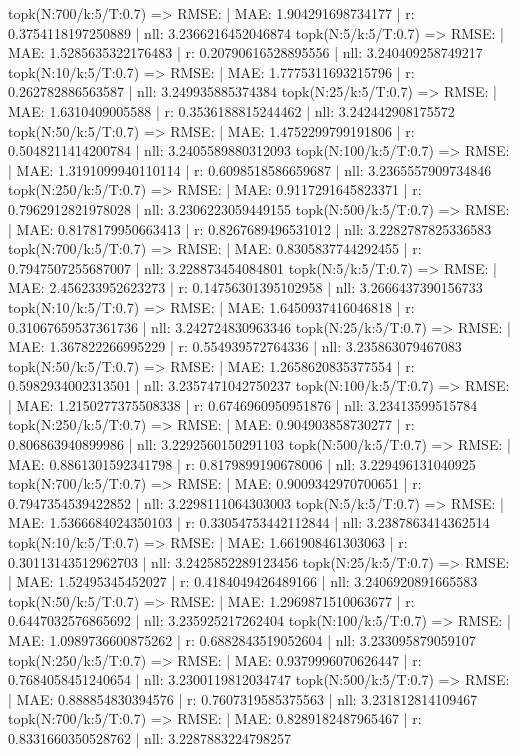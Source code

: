 topk(N:700/k:5/T:0.7) => RMSE: | MAE: 1.904291698734177 | r: 0.3754118197250889 | nll: 3.2366216452046874
topk(N:5/k:5/T:0.7) => RMSE: | MAE: 1.5285635322176483 | r: 0.20790616528895556 | nll: 3.240409258749217
topk(N:10/k:5/T:0.7) => RMSE: | MAE: 1.7775311693215796 | r: 0.262782886563587 | nll: 3.249935885374384
topk(N:25/k:5/T:0.7) => RMSE: | MAE: 1.6310409005588 | r: 0.3536188815244462 | nll: 3.242442908175572
topk(N:50/k:5/T:0.7) => RMSE: | MAE: 1.4752299799191806 | r: 0.5048211414200784 | nll: 3.2405589880312093
topk(N:100/k:5/T:0.7) => RMSE: | MAE: 1.3191099940110114 | r: 0.6098518586659687 | nll: 3.2365557909734846
topk(N:250/k:5/T:0.7) => RMSE: | MAE: 0.9117291645823371 | r: 0.7962912821978028 | nll: 3.2306223059449155
topk(N:500/k:5/T:0.7) => RMSE: | MAE: 0.8178179950663413 | r: 0.8267689496531012 | nll: 3.2282787825336583
topk(N:700/k:5/T:0.7) => RMSE: | MAE: 0.8305837744292455 | r: 0.7947507255687007 | nll: 3.228873454084801
topk(N:5/k:5/T:0.7) => RMSE: | MAE: 2.456233952623273 | r: 0.14756301395102958 | nll: 3.2666437390156733
topk(N:10/k:5/T:0.7) => RMSE: | MAE: 1.6450937416046818 | r: 0.31067659537361736 | nll: 3.242724830963346
topk(N:25/k:5/T:0.7) => RMSE: | MAE: 1.367822266995229 | r: 0.554939572764336 | nll: 3.235863079467083
topk(N:50/k:5/T:0.7) => RMSE: | MAE: 1.2658620835377554 | r: 0.5982934002313501 | nll: 3.2357471042750237
topk(N:100/k:5/T:0.7) => RMSE: | MAE: 1.2150277375508338 | r: 0.6746960950951876 | nll: 3.23413599515784
topk(N:250/k:5/T:0.7) => RMSE: | MAE: 0.904903858730277 | r: 0.806863940899986 | nll: 3.2292560150291103
topk(N:500/k:5/T:0.7) => RMSE: | MAE: 0.8861301592341798 | r: 0.8179899190678006 | nll: 3.229496131040925
topk(N:700/k:5/T:0.7) => RMSE: | MAE: 0.9009342970700651 | r: 0.7947354539422852 | nll: 3.2298111064303003
topk(N:5/k:5/T:0.7) => RMSE: | MAE: 1.5366684024350103 | r: 0.33054753442112844 | nll: 3.2387863414362514
topk(N:10/k:5/T:0.7) => RMSE: | MAE: 1.661908461303063 | r: 0.30113143512962703 | nll: 3.2425852289123456
topk(N:25/k:5/T:0.7) => RMSE: | MAE: 1.52495345452027 | r: 0.4184049426489166 | nll: 3.2406920891665583
topk(N:50/k:5/T:0.7) => RMSE: | MAE: 1.2969871510063677 | r: 0.6447032576865692 | nll: 3.235925217262404
topk(N:100/k:5/T:0.7) => RMSE: | MAE: 1.0989736600875262 | r: 0.6882843519052604 | nll: 3.233095879059107
topk(N:250/k:5/T:0.7) => RMSE: | MAE: 0.9379996070626447 | r: 0.7684058451240654 | nll: 3.2300119812034747
topk(N:500/k:5/T:0.7) => RMSE: | MAE: 0.888854830394576 | r: 0.7607319585375563 | nll: 3.231812814109467
topk(N:700/k:5/T:0.7) => RMSE: | MAE: 0.8289182487965467 | r: 0.8331660350528762 | nll: 3.2287883224798257
